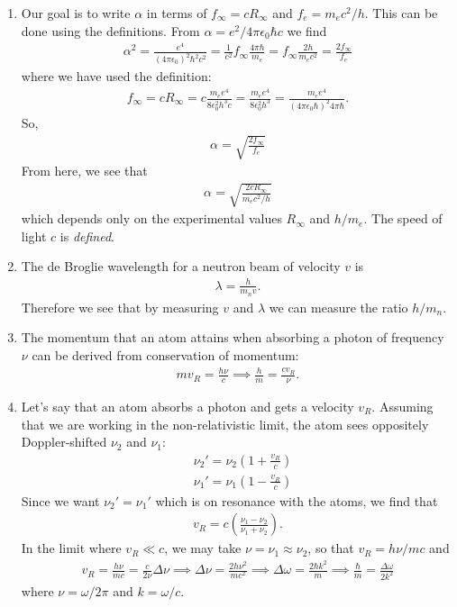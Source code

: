 \documentclass{book}
\theoremstyle{definition}
\newcommand{\al}{\alpha}
\newcommand{\f}[2]{\frac{#1}{#2}}
\newcommand{\lp}{\left(}
\newcommand{\rp}{\right)}
\begin{document}
\begin{enumerate}[label=(\alph*)]
	\item Our goal is to write $\al$ in terms of $f_\infty = cR_\infty$ and $f_e = m_ec^2/h$. This can be done using the definitions. From $\al =e^2/4\pi \epsilon_0 \hbar c$ we find 
	\begin{align*}
		\al^2 = \f{e^4}{(4\pi \epsilon_0)^2 \hbar^2 c^2} = \f{1}{c^2} f_\infty \f{4\pi \hbar}{m_e} = f_\infty \f{2h}{m_ec^2} = \f{2f_\infty}{f_e}
	\end{align*} 
	where we have used the definition:
	\begin{align*}
		f_\infty = c R_\infty = c\f{m_ee^4}{8 \epsilon_0^2 h^3 c }  =\f{m_ee^4}{8 \epsilon_0^2 h^3 } = \f{m_ee^4}{(4\pi\epsilon_0 \hbar )^2 4\pi \hbar }.
	\end{align*}
	So, 
	\begin{align*}
		\boxed{\al = \sqrt{\f{2f_\infty}{f_e} }}
	\end{align*}
	From here, we see that 
	\begin{align*}
		\al = \sqrt{\f{2cR_\infty}{m_e c^2/h}}
	\end{align*}
	which depends only on the experimental values $R_\infty$ and $h/m_e$. The speed of light $c$ is \textit{defined}. 
	
	
	
	
	\item The de Broglie wavelength for a neutron beam of velocity $v$ is 
	\begin{align*}
		\lambda = \f{h}{m_n v}. 
	\end{align*}
	Therefore we see that by measuring $v$ and $\lambda$ we can measure the ratio $h/m_n$. 
	
	\item The momentum that an atom attains when absorbing a photon of frequency $\nu$ can be derived from conservation of momentum: 
	\begin{align*}
		mv_R = \f{h\nu}{c} \implies \f{h}{m} = \f{cv_R}{\nu}.
	\end{align*}
	
	\item Let's say that an atom absorbs a photon and gets a velocity $v_R$. Assuming that we are working in the non-relativistic limit, the atom sees oppositely Doppler-shifted $\nu_2$ and $\nu_1$:
	\begin{align*}
		&\nu_2' = \nu_2 \lp 1 + \f{v_R}{c} \rp\\
		&\nu_1' = \nu_1 \lp 1 - \f{v_R}{c} \rp
	\end{align*}
	Since we want $\nu_2' = \nu_1'$ which is on resonance with the atoms, we find that
	\begin{align*}
		v_R = c\lp \f{\nu_1- \nu_2}{\nu_1 + \nu_2}\rp.
	\end{align*}
	In the limit where $v_R \ll c$, we may take $\nu = \nu_1 \approx \nu_2$, so that $v_R = h\nu / mc$ and 
	\begin{align*}
		v_R = \f{h\nu}{mc} = \f{c}{2\nu}\Delta \nu \implies \Delta \nu = \f{2h\nu^2}{mc^2} \implies \Delta \omega = \f{2\hbar k^2}{m} \implies \boxed{\f{\hbar}{m} = \f{\Delta \omega}{2k^2}}
	\end{align*}
	where $\nu = \omega/2\pi$ and $k = \omega/c$.
	

\end{enumerate}
\end{document}
